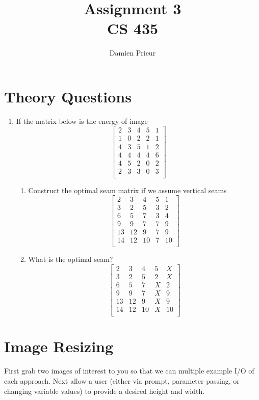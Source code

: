 \documentclass{article}
\author{Damien Prieur}
\title{Assignment 3 \\ CS 435}
\date{}
\begin{document}
\maketitle

\section{Theory Questions}
\begin{enumerate}
\item If the matrix below is the energy of image
$$
\begin{bmatrix}
2&	3&	4&	5&	1\\
1&	0&	2&	2&	1\\
4&	3&	5&	1&	2\\
4&	4&	4&	4&	6\\
4&	5&	2&	0&	2\\
2&	3&	3&	0&	3\\
\end{bmatrix}
$$

\begin{enumerate}
\item Construct the optimal seam matrix if we assume vertical seams
$$
\begin{bmatrix}
2&	3&	4&	5&	1\\
3&	2&	5&	3&	2\\
6&	5&	7&	3&	4\\
9&	9&	7&	7&	9\\
13&	12&	9&	7&	9\\
14&	12&	10&	7&	10\\
\end{bmatrix}
$$
\item What is the optimal seam?
$$
\begin{bmatrix}
2&	3&	4&	5&	X\\
3&	2&	5&	2&	X\\
6&	5&	7&	X&	2\\
9&	9&	7&	X&	9\\
13&	12&	9&	X&	9\\
14&	12&	10&	X&	10\\
\end{bmatrix}
$$
\end{enumerate}
\end{enumerate}

\newpage
\section{Image Resizing}
First grab two images of interest to you so that we can multiple example I/O of each approach.   Next allow a user (either via prompt, parameter passing, or changing variable values) to provide a desired height and width.\\ 
\end{document}
